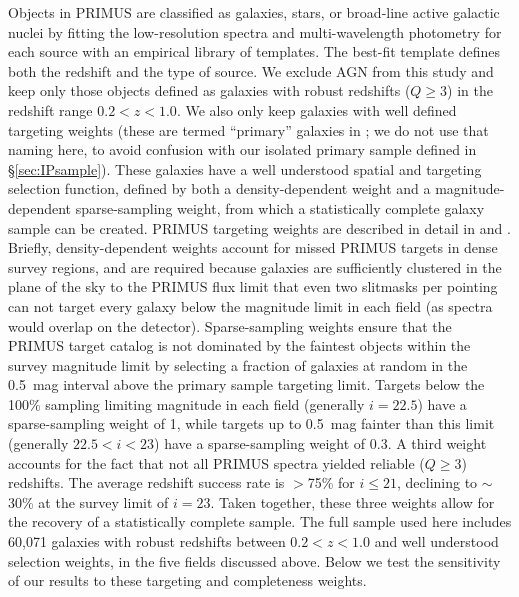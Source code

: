 Objects in PRIMUS are classified as galaxies, stars, or broad-line active galactic nuclei by fitting the low-resolution spectra and multi-wavelength photometry 
for each source with an empirical library of templates.
The best-fit template defines both the redshift and the type of source.  
We exclude AGN from this study and keep only those objects defined as galaxies with robust redshifts {($Q\ge 3$)} in the redshift range {$0.2 < z < 1.0$}.
We also only keep galaxies with well defined targeting weights (these are termed ``primary'' galaxies in \citet{Coil11}; we do not use that naming here, to avoid 
confusion with our isolated primary sample defined in \S\ref{sec:IPsample}).
These galaxies have a well understood spatial and targeting selection function, defined by both a density-dependent weight and a magnitude-dependent sparse-sampling 
weight, from which a statistically complete galaxy sample can be created.
PRIMUS targeting weights are described in detail in \citet{Coil11} and \citet{Cool13}.
Briefly, density-dependent weights account for missed PRIMUS targets in dense survey regions, and are required because galaxies are sufficiently clustered in the plane of
the sky to the PRIMUS flux limit that even two slitmasks per pointing can not target every galaxy below the magnitude limit in each field (as spectra would overlap 
on the detector).
Sparse-sampling weights ensure that the PRIMUS target catalog is not dominated by the faintest objects within the survey magnitude limit by selecting a fraction 
of galaxies at random in the 0.5~mag interval above the primary sample targeting limit.
Targets below the 100\% sampling limiting magnitude in each field (generally $i=22.5$) have a sparse-sampling weight of 1, while targets up to 0.5~mag fainter than 
this limit (generally $22.5<i<23$) have a sparse-sampling weight of 0.3.
A third weight \citep[detailed in][]{Cool13} accounts for the fact that not all PRIMUS spectra yielded reliable {($Q \ge 3$)} redshifts.
The average redshift success rate is $>$75\% for {$i\le21$}, declining to $\sim$30\% at the survey limit of $i=23$.
Taken together, these three weights allow for the recovery of a statistically complete sample.
The full sample used here includes 60,071 galaxies with robust redshifts between $0.2<z<1.0$ and well understood selection weights, in the five fields discussed above.
Below we test the sensitivity of our results to these targeting and completeness weights.

